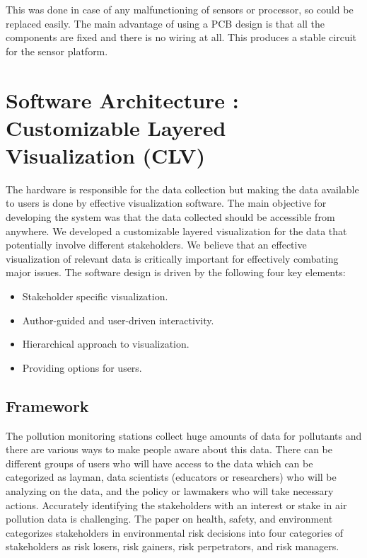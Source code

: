  This was done in case of any malfunctioning of sensors or processor, so could be replaced easily. The main advantage of using a PCB design is that all the components are fixed and there is no wiring at all. This produces a stable circuit for the sensor platform.

\section{Software Architecture : Customizable Layered Visualization (CLV)}

The hardware is responsible for the data collection but making the data available to users is done by effective visualization software. The main objective for developing the system was that the data collected should be accessible from anywhere. We developed a customizable layered visualization for the data that potentially involve different stakeholders. We believe that an effective visualization of relevant data is critically important for effectively combating major issues. The software design is driven by the following four key elements:

\begin{itemize}

\item Stakeholder specific  visualization.

\item Author-guided and user-driven interactivity.

\item Hierarchical approach to visualization.

\item Providing options for users.

\end{itemize}



\subsection{Framework}

The pollution monitoring stations collect huge amounts of data for pollutants and there are various ways to make people aware about this data. There can be different groups of users who will have access to the data which can be categorized as layman, data scientists (educators or researchers) who will be analyzing on the data, and the policy or lawmakers who will take necessary actions. Accurately identifying the stakeholders with an interest or stake in air pollution data is challenging. The paper on health, safety, and environment  \cite{English2000} categorizes stakeholders in environmental risk decisions into four categories of stakeholders as risk losers, risk gainers, risk perpetrators, and risk managers. 


